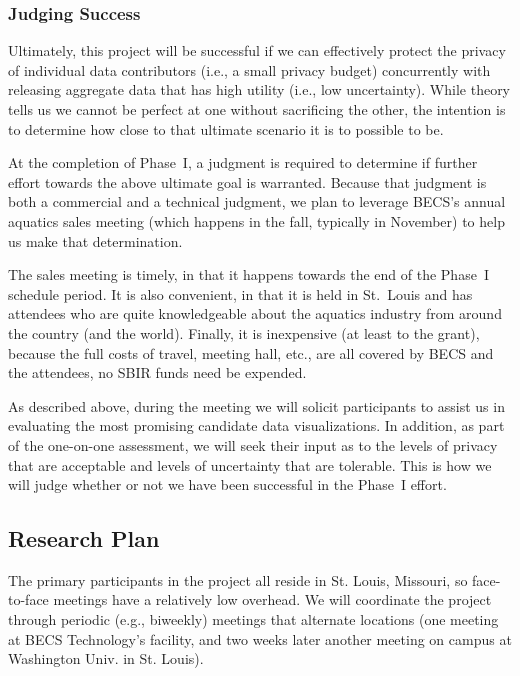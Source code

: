 \subsubsection{Judging Success}

Ultimately, this project will be successful if we can effectively
protect the privacy of individual data contributors (i.e., a small
privacy budget) concurrently with releasing aggregate data that has
high utility (i.e., low uncertainty).  While theory tells us we cannot
be perfect at one without sacrificing the other, the intention
is to determine how close to that ultimate scenario it is to possible to be.

At the completion of Phase~I, a judgment is required to determine if
further effort towards the above ultimate goal is warranted.
Because that judgment is both a commercial and a technical judgment, we
plan to leverage BECS's annual aquatics sales meeting (which happens in
the fall, typically in November) to help us make that determination.

The sales meeting is timely, in that it happens towards the end of
the Phase~I schedule period.  It is also convenient, in that it is held
in St.~Louis and has attendees who are quite knowledgeable about 
the aquatics industry from around the country (and the world).
Finally, it is inexpensive (at least to the grant), because the full
costs of travel, meeting hall, etc., are all covered by BECS and
the attendees, no SBIR funds need be expended.

As described above, during the meeting we will solicit participants
to assist us in evaluating the most promising candidate data visualizations.
In addition, as part of the one-on-one assessment, we will seek their
input as to the levels of privacy that are acceptable and levels of 
uncertainty that are tolerable.
This is how we will judge whether or not we have been successful
in the Phase~I effort.

\subsection{Research Plan}
\label{sec:plan}

The primary participants in the project all reside in St. Louis, Missouri,
so face-to-face meetings have a relatively low overhead. We will coordinate
the project through periodic (e.g., biweekly) meetings that alternate
locations (one meeting at BECS Technology's facility, and two weeks later
another meeting on campus at Washington Univ. in St. Louis).

